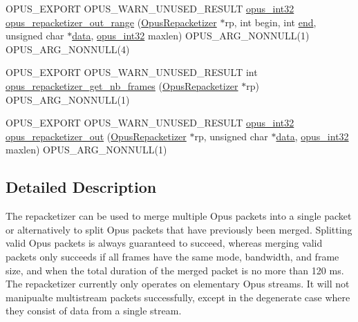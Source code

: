 \begin{DoxyCompactItemize}
\item 
O\+P\+U\+S\+\_\+\+E\+X\+P\+O\+RT O\+P\+U\+S\+\_\+\+W\+A\+R\+N\+\_\+\+U\+N\+U\+S\+E\+D\+\_\+\+R\+E\+S\+U\+LT \mbox{\hyperlink{opus__types_8h_aa4d309d6f80b99dbabebc8f98879ab9a}{opus\+\_\+int32}} \mbox{\hyperlink{group__opus__repacketizer_gad06762a8f4032823f6b64b63e8416efc}{opus\+\_\+repacketizer\+\_\+out\+\_\+range}} (\mbox{\hyperlink{group__opus__repacketizer_ga1f85070a64bcbf5bf24f5ccb80323e7b}{Opus\+Repacketizer}} $\ast$rp, int begin, int \mbox{\hyperlink{_s_d_l__opengl_8h_a432111147038972f06e049e18a837002}{end}}, unsigned char $\ast$\mbox{\hyperlink{_s_d_l__opengl_8h_a2e335d56e2846b0fea47eed068b2d34a}{data}}, \mbox{\hyperlink{opus__types_8h_aa4d309d6f80b99dbabebc8f98879ab9a}{opus\+\_\+int32}} maxlen) O\+P\+U\+S\+\_\+\+A\+R\+G\+\_\+\+N\+O\+N\+N\+U\+LL(1) O\+P\+U\+S\+\_\+\+A\+R\+G\+\_\+\+N\+O\+N\+N\+U\+LL(4)
\item 
O\+P\+U\+S\+\_\+\+E\+X\+P\+O\+RT O\+P\+U\+S\+\_\+\+W\+A\+R\+N\+\_\+\+U\+N\+U\+S\+E\+D\+\_\+\+R\+E\+S\+U\+LT int \mbox{\hyperlink{group__opus__repacketizer_ga0abed93ad18e8b2bd8b5bd10189c3e97}{opus\+\_\+repacketizer\+\_\+get\+\_\+nb\+\_\+frames}} (\mbox{\hyperlink{group__opus__repacketizer_ga1f85070a64bcbf5bf24f5ccb80323e7b}{Opus\+Repacketizer}} $\ast$rp) O\+P\+U\+S\+\_\+\+A\+R\+G\+\_\+\+N\+O\+N\+N\+U\+LL(1)
\item 
O\+P\+U\+S\+\_\+\+E\+X\+P\+O\+RT O\+P\+U\+S\+\_\+\+W\+A\+R\+N\+\_\+\+U\+N\+U\+S\+E\+D\+\_\+\+R\+E\+S\+U\+LT \mbox{\hyperlink{opus__types_8h_aa4d309d6f80b99dbabebc8f98879ab9a}{opus\+\_\+int32}} \mbox{\hyperlink{group__opus__repacketizer_gaa1b5f68279829dcbaf31d374b2f3eac4}{opus\+\_\+repacketizer\+\_\+out}} (\mbox{\hyperlink{group__opus__repacketizer_ga1f85070a64bcbf5bf24f5ccb80323e7b}{Opus\+Repacketizer}} $\ast$rp, unsigned char $\ast$\mbox{\hyperlink{_s_d_l__opengl_8h_a2e335d56e2846b0fea47eed068b2d34a}{data}}, \mbox{\hyperlink{opus__types_8h_aa4d309d6f80b99dbabebc8f98879ab9a}{opus\+\_\+int32}} maxlen) O\+P\+U\+S\+\_\+\+A\+R\+G\+\_\+\+N\+O\+N\+N\+U\+LL(1)
\end{DoxyCompactItemize}


\subsection{Detailed Description}
The repacketizer can be used to merge multiple Opus packets into a single packet or alternatively to split Opus packets that have previously been merged. Splitting valid Opus packets is always guaranteed to succeed, whereas merging valid packets only succeeds if all frames have the same mode, bandwidth, and frame size, and when the total duration of the merged packet is no more than 120 ms. The repacketizer currently only operates on elementary Opus streams. It will not manipualte multistream packets successfully, except in the degenerate case where they consist of data from a single stream.

